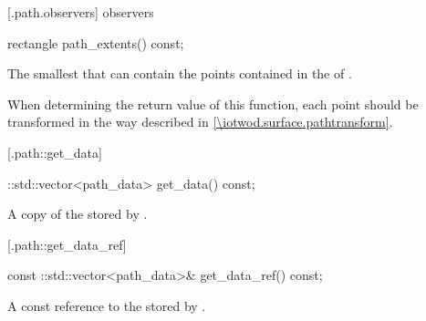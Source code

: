  [\iotwod.path.observers] { observers}

%
%
\begin{itemdecl}
rectangle path_extents() const;
\end{itemdecl}
\begin{itemdescr}
	\pnum
	\returns
	The smallest  that can contain the points contained in the 
	 of .
	
	\pnum
	\remarks
	When determining the return value of this function, each point should be 
	transformed in the way described in \ref{\iotwod.surface.pathtransform}.
\end{itemdescr}

 [\iotwod.path::get_data] {}

%
%
\begin{itemdecl}
::std::vector<path_data> get_data() const;
\end{itemdecl}
\begin{itemdescr}
	\pnum
	\returns
	A copy of the  stored by .
\end{itemdescr}

 [\iotwod.path::get_data_ref] {}

%
%
\begin{itemdecl}
const ::std::vector<path_data>& get_data_ref() const;
\end{itemdecl}
\begin{itemdescr}
	\pnum
	\returns
	A const reference to the  stored by .
\end{itemdescr}
